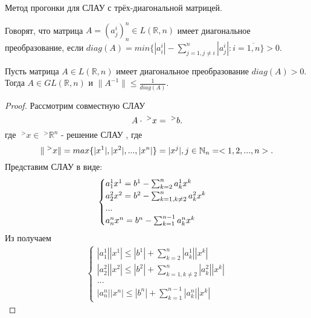 \documentclass[__main__.tex]{subfiles}
\begin{document}
Метод прогонки для СЛАУ с трёх-диагональной матрицей.

\begin{definition}
    Говорят, что матрица $A = (a^i_j)^n_n \in L(\mathbb{R},n)$ имеет диагональное преобразование, если $diag(A) = min\lbrace |a^i_i| - \sum_{j=1, j \neq i}^{n} |a^i_j|: i = \overline{1,n} \rbrace > 0$.
\end{definition}

\begin{theorem}
    Пусть матрица $A \in L(\mathbb{R},n)$ имеет диагональное преобразование $diag(A) > 0$. Тогда $A \in GL(\mathbb{R},n)$ и $\lVert A^{-1} \rVert \leqslant \frac{1}{diag(A)}$.
\end{theorem}

\begin{proof}
    Рассмотрим совместную СЛАУ
    \begin{equation}
        \llabel{2_1}
        A \cdot \;^{>}x = \;^{>}b.
    \end{equation}
    где $\;^{>}x \in \;^{>}\mathbb{R}^n$ - решение СЛАУ , где
    \begin{equation}
        \llabel{2_2}
        \lVert \;^{>}x \rVert = max \lbrace |x^1|, |x^2|, ... , |x^n| \rbrace = |x^j|, j \in \mathbb{N}_n = <1, 2, ..., n>.
    \end{equation}
    Представим СЛАУ  в виде:
    \begin{gather}
        \llabel{2_3}
        \begin{cases}
            a^1_1 x^1 = b^1 - \sum_{k=2}^{n} a^1_k x^k          \\
            a^2_2 x^2 = b^2 - \sum_{k=1, k\neq 2}^{n} a^2_k x^k \\
            ...                                                 \\
            a^n_n x^n = b^n - \sum_{k=1}^{n-1} a^n_k x^k
        \end{cases}
    \end{gather}
    Из  получаем
    \begin{gather*}
        \begin{cases}
            |a^1_1| |x^1| \leqslant |b^1| + \sum_{k=2}^{n} |a^1_k| |x^k|          \\
            |a^2_2| |x^2| \leqslant |b^2| + \sum_{k=1,k \neq 2}^{n} |a^2_k| |x^k| \\
            ...                                                                   \\
            |a^n_n| |x^n| \leqslant |b^n| + \sum_{k=1}^{n-1} |a^n_k| |x^k|

\end{cases}
\end{gather*}
\end{proof}
\end{document}
